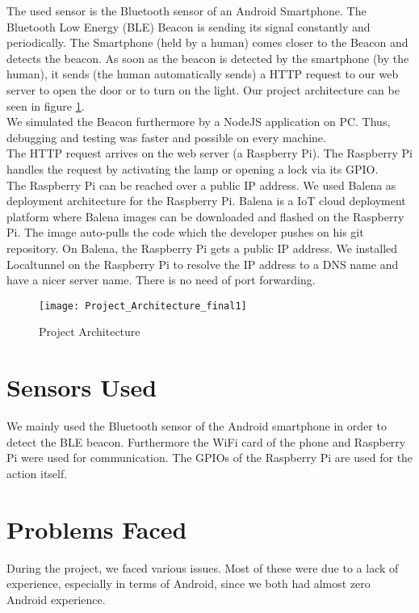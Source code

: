 \documentclass[
10pt, %
a4paper, %
oneside, %
headinclude,footinclude, %
BCOR5mm, %
]{scrartcl}
\begin{document}
\noindent The used sensor is the Bluetooth sensor of an Android Smartphone. The Bluetooth Low Energy (BLE) Beacon is sending its signal constantly and periodically. The Smartphone (held by a human) comes closer to the Beacon and detects the beacon. As soon as the beacon is detected by the smartphone (by the human), it sends (the human automatically sends) a HTTP request to our web server to open the door or to turn on the light. Our project architecture can be seen in figure \ref{fig:projectarchitecturefinal}.\\

\noindent We simulated the Beacon furthermore by a NodeJS application on PC. Thus, debugging and testing was faster and possible on every machine.\\

\noindent The HTTP request arrives on the web server (a Raspberry Pi). The Raspberry Pi handles the request by activating the lamp or opening a lock via its GPIO.\\

\noindent The Raspberry Pi can be reached over a public IP address. We used Balena as deployment architecture for the Raspberry Pi. Balena \cite{balena} is a IoT cloud deployment platform where Balena images can be downloaded and flashed on the Raspberry Pi. The image auto-pulls the code which the developer pushes on his git repository. On Balena, the Raspberry Pi gets a public IP address. We installed Localtunnel \cite{localtunnel} on the Raspberry Pi to resolve the IP address to a DNS name and have a nicer server name. There is no need of port forwarding.
 
 
\begin{figure}[h]
	\centering
	\texttt{[image: Project\_Architecture\_final1]}
	\caption{Project Architecture}
	\label{fig:projectarchitecturefinal}
\end{figure}

\section{Sensors Used}
We mainly used the Bluetooth sensor of the Android smartphone in order to detect the BLE beacon. Furthermore the WiFi card of the phone and Raspberry Pi were used for communication. The GPIOs of the Raspberry Pi are used for the action itself.


\section{Problems Faced}
During the project, we faced various issues. Most of these were due to a lack of experience, especially in terms of Android, since we both had almost zero Android experience.
\end{document}
